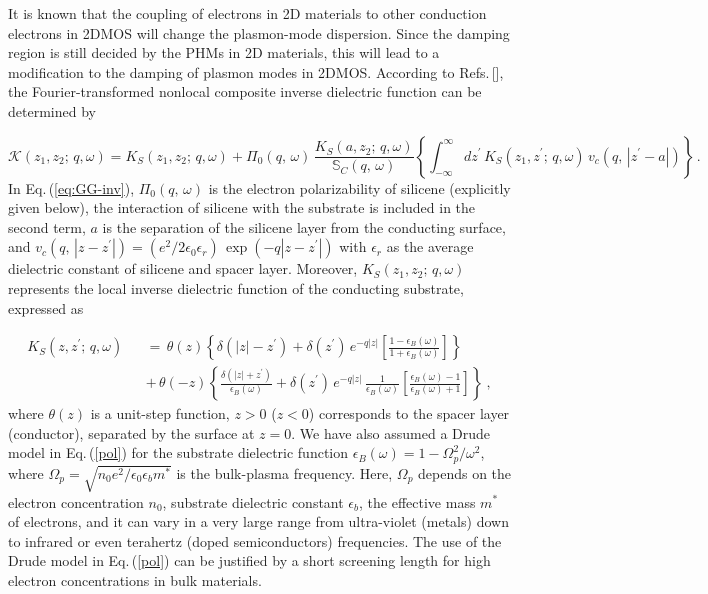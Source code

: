 \documentclass[aps,prb,showpacs]{revtex4}
\begin{document}
It is known that the coupling of electrons in 2D materials to other conduction electrons in 2DMOS will change the plasmon-mode dispersion. Since the damping region is still decided by the 
PHMs in 2D materials, this will lead to a modification to the damping of plasmon modes in 2DMOS.
According to Refs.\,[], the Fourier-transformed nonlocal composite inverse dielectric function can be determined by 

\begin{equation}
\mathcal{K}(z_1,z_2;\,q,\omega)= K_S(z_1,z_2;\,q,\omega)+\Pi_0(q,\,\omega)\,\frac{K_S(a,z_2;\,q,\omega)}{\mathbb{S}_{C}(q,\,\omega)}
\left\{ \int_{-\infty}^\infty dz^\prime\,K_S(z_1,z^\prime;\,q,\omega)\,v_c(q,\,|z^\prime-a|) \right\}\, .
\label{eq:GG-inv}
\end{equation}
In Eq.\,(\ref{eq:GG-inv}), $\Pi_0(q,\,\omega)$ is the electron polarizability of silicene (explicitly given below),
the interaction of silicene with the substrate is included in the second term,
$a$ is the separation of the silicene layer from the conducting surface, and $v_c(q,\,|z-z^\prime|)=(e^2/2\epsilon_0\epsilon_r)\,\exp(-q|z-z^\prime|)$
with $\epsilon_r$ as the average dielectric constant of silicene and spacer layer. Moreover,
$K_S(z_1,z_2;\,q,\omega)$ represents the local inverse dielectric function of the conducting substrate, expressed as

\begin{eqnarray}
K_S(z,z^\prime;\,q,\omega) &&  = \, \theta(z)\left\{ \delta(|z|-z^\prime)+\delta(z^\prime)\,
e^{-q|z|} \left[ \frac{1-\epsilon_B(\omega)}{1+\epsilon_B(\omega)} \right]  \right\}
\nonumber\\
&& + \, \theta(-z) \left\{ \frac{\delta(|z|+z^\prime)}{\epsilon_B(\omega)}+\delta(z^\prime)\,
e^{-q|z|}\, \frac{1}{\epsilon_B(\omega)} \left[ \frac{\epsilon_B
(\omega)-1}{\epsilon_B(\omega)+1} \right]  \right\} \ ,
\label{pol}
\end{eqnarray}
where $\theta(z)$ is a unit-step function, $z>0$ ($z<0$) corresponds to the spacer layer (conductor),
separated by the surface at $z=0$. We have also assumed a Drude model in Eq.\,(\ref{pol}) for the substrate dielectric function
$\epsilon_B(\omega)= 1 - \Omega_p^2/\omega^2$, where $\Omega_p = \sqrt{n_0e^2/\epsilon_0 \epsilon_b m^*}$
is the bulk-plasma frequency. Here, $\Omega_p$ depends on the electron concentration $n_0$, substrate dielectric constant $\epsilon_b$, 
the effective mass $m^*$ of electrons, and it can vary in a very large range from ultra-violet (metals) down to infrared or even terahertz (doped semiconductors) frequencies.
The use of the Drude model in Eq.\,(\ref{pol}) can be justified by a short screening length for high electron concentrations in bulk materials.
\medskip
\end{document}
